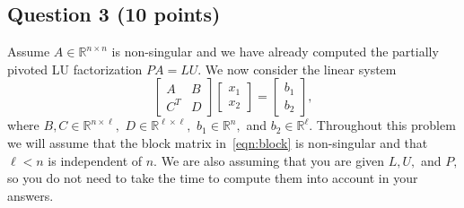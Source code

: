 \documentclass[11pt,onecolumn]{article}
\newcommand{\R}{\mathbb{R}}
\newcommand{\Rn}{\R^{n\times n}}
\begin{document}
\subsection*{Question 3 (10 points)}
Assume $A\in\Rn$ is non-singular and we have already computed the partially pivoted LU factorization $PA = LU.$ We now consider the linear system
\begin{equation}
    \label{eqn:block}
    \begin{bmatrix}A & B \\ C^T& D \end{bmatrix} \begin{bmatrix}x_1 \\  x_2 \end{bmatrix} = \begin{bmatrix}b_1 \\  b_2 \end{bmatrix},
\end{equation}
where $B,C\in\R^{n\times \ell},$ $D\in\R^{\ell\times \ell},$ $b_1\in\R^n,$ and $b_2\in\R^{\ell}.$ Throughout this problem we will assume that the block matrix in~\eqref{eqn:block} is non-singular and that $\ell < n$ is independent of $n$. We are also assuming that you are given $L, U,$ and $P,$ so you do not need to take the time to compute them into account in your answers.
\end{document}
